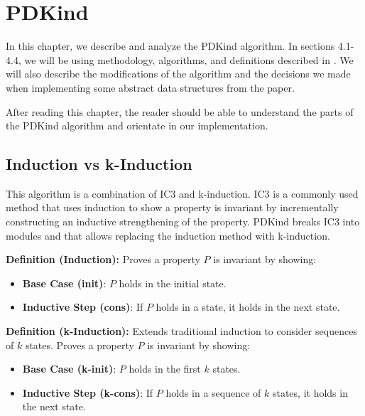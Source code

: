 \chapter{PDKind}

\noindent In this chapter, we describe and analyze the PDKind algorithm. In sections 4.1-4.4, we will be using methodology, algorithms, and definitions described in \cite{7886665}.
We will also describe the modifications of the algorithm and the decisions we made when implementing some abstract data structures from the paper.

After reading this chapter, the reader should be able to understand the parts of the PDKind algorithm and orientate in our implementation. 

\section{Induction vs k-Induction}

\noindent This algorithm is a combination of IC3 and k-induction.
IC3 is a commonly used method that uses induction to show a property is invariant by incrementally constructing an inductive strengthening of the property. PDKind breaks IC3 into modules and that allows replacing the induction method with k-induction.


\vspace{\baselineskip}\noindent \textbf{Definition (Induction):} Proves a property \( P \) is invariant by showing:
\begin{itemize}
    \item \textbf{Base Case (init)}: \( P \) holds in the initial state.
    \item \textbf{Inductive Step (cons)}: If \( P \) holds in a state, it holds in the next state.
\end{itemize}


\vspace{\baselineskip}\noindent \textbf{Definition (k-Induction):} Extends traditional induction to consider sequences of \( k \) states. Proves a property \( P \) is invariant by showing:
\begin{itemize}
    \item \textbf{Base Case (k-init)}: \( P \) holds in the first \( k \) states.
    \item \textbf{Inductive Step (k-cons)}: If \( P \) holds in a sequence of \( k \) states, it holds in the next state.
\end{itemize}

